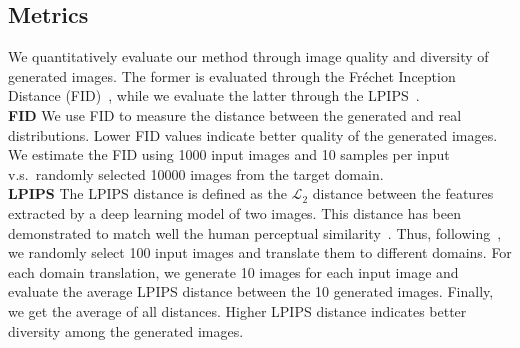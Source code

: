 \documentclass[runningheads]{llncs}
\begin{document}
\subsection{Metrics}
We quantitatively evaluate our method through image quality and diversity of generated images. The former is evaluated through the Fr\'echet Inception Distance (FID)~\cite{NIPS2017_7240}, while we evaluate the latter through the LPIPS~\cite{zhang2018unreasonable}. \\
\noindent\textbf{FID} We use FID to measure the distance between the generated and real distributions. Lower FID values indicate better quality of the generated images. We estimate the FID using 1000 input images and 10 samples per input v.s.\ randomly selected 10000 images from the target domain. \\
\noindent\textbf{LPIPS} The LPIPS distance is defined as the $\mathcal{L}_2$ distance between the features extracted by a deep learning model of two images. This distance has been demonstrated to match well the human perceptual similarity~\cite{zhang2018unreasonable}. Thus, following~\cite{huang2018multimodal,lee2018diverse,zhu2017toward}, we randomly select 100 input images and translate them to different domains. For each domain translation, we generate 10 images for each input image and evaluate the average LPIPS distance between the 10 generated images. Finally, we get the average of all distances. Higher LPIPS distance indicates better diversity among the generated images.
\end{document}
